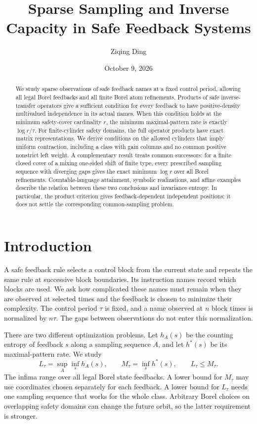 \documentclass[11pt,reqno]{amsart}
\title[Sparse sampling and inverse capacity]{Sparse Sampling and Inverse Capacity in Safe Feedback Systems}
\author{Ziqing Ding}
\date{October 9, 2026}
\numberwithin{equation}{section}
\theoremstyle{definition}
\begin{document}
\begin{abstract}
We study sparse observations of safe feedback names at a fixed control
period, allowing all legal Borel feedbacks and all finite Borel atom
refinements. Products of safe inverse-transfer operators give a
sufficient condition for every feedback to have positive-density
multivalued independence in its actual names. When this condition holds
at the minimum safety-cover cardinality $r$, the minimum maximal-pattern
rate is exactly $\log r/\tau$. For finite-cylinder safety domains, the
full operator products have exact matrix representations. We derive
conditions on the allowed cylinders that imply uniform contraction,
including a class with gain columns and no common positive nonstrict
left weight. A complementary result treats common successors: for a
finite closed cover of a mixing one-sided shift of finite type, every
prescribed sampling sequence with diverging gaps gives the exact minimum
$\log r$ over all Borel refinements. Countable-language attainment,
symbolic realizations, and affine examples describe the relation between
these two conclusions and invariance entropy. In particular, the
product criterion gives feedback-dependent independent positions; it
does not settle the corresponding common-sampling problem.
\end{abstract}
\maketitle
\tableofcontents

\section{Introduction}\label{sec:intro}

A safe feedback rule selects a control block from the current state and
repeats the same rule at successive block boundaries. Its instruction
names record which blocks are used. We ask how complicated these names
must remain when they are observed at selected times and the feedback
is chosen to minimize their complexity. The control period $\tau$ is
fixed, and a name observed at $n$ block times is normalized by $n\tau$.
The gaps between observations do not enter this normalization.

There are two different optimization problems. Let $h_A(s)$ be the
counting entropy of feedback $s$ along a sampling sequence $A$, and let
$h^*(s)$ be its maximal-pattern rate. We study
\[
 L_\tau=\sup_A\inf_s h_A(s),\qquad
 M_\tau=\inf_s h^*(s),\qquad L_\tau\le M_\tau.
\]
The infima range over all legal Borel state feedbacks. A lower bound for
$M_\tau$ may use coordinates chosen separately for each feedback. A
lower bound for $L_\tau$ needs one sampling sequence that works for the
whole class. Arbitrary Borel choices on overlapping safety domains can
change the future orbit, so the latter requirement is stronger.
\end{document}
